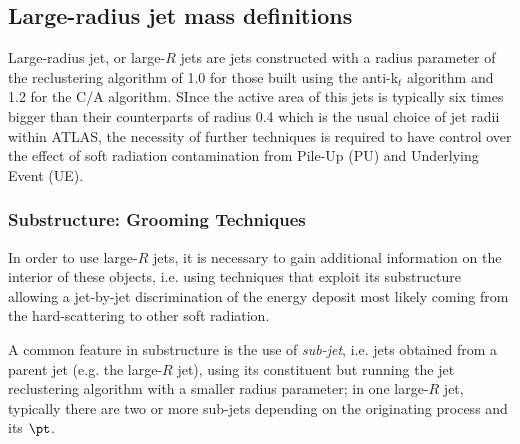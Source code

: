 
\subsection{Large-radius jet mass definitions}




Large-radius jet, or large-$R$ jets are jets constructed with a radius parameter of the reclustering algorithm of 1.0 for those built using the anti-k$_t$ algorithm and 1.2 for the C/A algorithm.
SInce the active area of this jets is typically six times bigger than their counterparts of radius 0.4 which is the usual choice of jet radii within ATLAS, the necessity of further techniques is required to have control over the effect of soft radiation contamination from Pile-Up (PU) and Underlying Event (UE).

\subsubsection{Substructure: Grooming Techniques}

In order to use large-$R$ jets, it is necessary to gain additional information on the interior of these objects, i.e. using techniques that exploit its substructure allowing a jet-by-jet discrimination of the energy deposit most likely coming from the hard-scattering to other soft radiation.

A common feature in substructure is the use of \textit{sub-jet}, i.e. jets obtained from a parent jet (e.g. the large-$R$ jet), using its constituent but running the jet reclustering algorithm with a smaller radius parameter; in one large-$R$ jet, typically there are two or more sub-jets depending on the originating process and its $\pt$.

